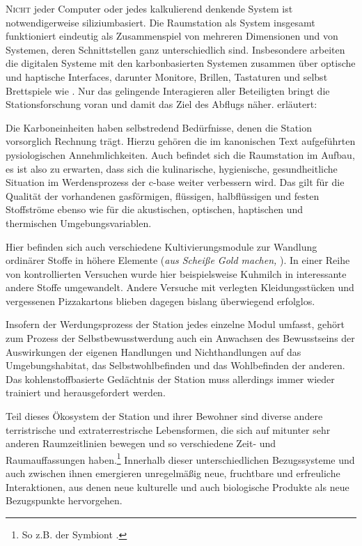 \begin{newstuff}
    \lettrine{N}{icht} jeder Computer oder jedes kalkulierend denkende System ist notwendigerweise siliziumbasiert. Die Raumstation als System insgesamt funktioniert eindeutig als Zusammenspiel von mehreren Dimensionen und von Systemen, deren Schnittstellen ganz unterschiedlich sind. Insbesondere arbeiten die digitalen Systeme mit den karbonbasierten Systemen zusammen über optische und haptische Interfaces, darunter Monitore, Brillen, Tastaturen und selbst Brettspiele wie . Nur das gelingende Interagieren aller Beteiligten bringt die Stationsforschung voran und damit das Ziel des Abflugs näher. \cite[S. 169]{cbasebook} erläutert:

    
    Die Karboneinheiten haben selbstredend Bedürfnisse, denen die Station vorsorglich Rechnung trägt.
    Hierzu gehören die im kanonischen Text aufgeführten pysiologischen Annehmlichkeiten. Auch befindet sich die  Raumstation im Aufbau, es ist also zu erwarten, dass sich die kulinarische, hygienische, gesundheitliche Situation im Werdensprozess der c-base weiter verbessern wird. Das gilt für die Qualität der vorhandenen gasförmigen, flüssigen, halbflüssigen und festen Stoffströme ebenso wie für die akustischen, optischen, haptischen und thermischen Umgebungsvariablen. 

    Hier befinden sich auch verschiedene Kultivierungsmodule zur Wandlung ordinärer Stoffe in höhere Elemente (\emph{aus Scheiße Gold machen,} ). In einer Reihe von kontrollierten Versuchen wurde hier beispielsweise Kuhmilch in interessante andere Stoffe umgewandelt. Andere Versuche mit verlegten Kleidungsstücken und vergessenen \mbox{Pizza}\-kartons blieben dagegen bislang überwiegend erfolglos.
  
    Insofern der Werdungsprozess der Station jedes einzelne Modul umfasst, gehört zum Prozess der Selbstbewusstwerdung auch ein Anwachsen des Bewusstseins der Auswirkungen der eigenen Handlungen und Nichthandlungen auf das Umgebungshabitat, das Selbstwohlbefinden und das Wohlbefinden der anderen. Das kohlenstoffbasierte Gedächtnis der Station muss allerdings immer wieder trainiert und herausgefordert werden.

    Teil dieses Ökosystem der Station und ihrer Bewohner sind diverse andere terristrische und extraterrestrische Lebensformen, die sich auf mitunter sehr anderen Raumzeitlinien bewegen und so verschiedene Zeit- und Raumauffassungen haben.\footnote{So z.B. der Symbiont \cite{symbiont}.} Innerhalb dieser unterschiedlichen Bezugssysteme und auch zwischen ihnen emergieren unregelmäßig neue, fruchtbare und erfreuliche Interaktionen, aus denen neue kulturelle und auch biologische Produkte als neue Bezugspunkte hervorgehen. 


\end{newstuff}
